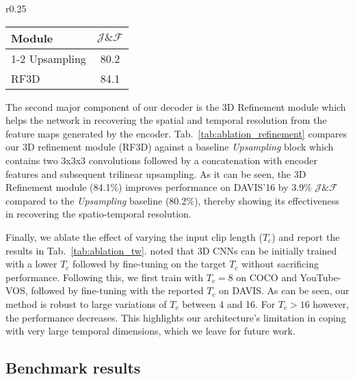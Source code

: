 \documentclass{bmvc2k}
\newcommand{\PAR}[1]{\vskip4pt \noindent {\bf #1~}}
\begin{document}
\begin{wraptable}{r}{0.25\textwidth}
\setlength{\tabcolsep}{5px}\footnotesize
\vspace{-19pt}\begin{tabular}[t]{l | c} \toprule
            Module & $\mathcal{J}\&\mathcal{F}$ \\
\cmidrule(lr){1-2}
                Upsampling &80.2 \\
                RF3D  &  84.1\\
\bottomrule
            \end{tabular}
\caption{Analysis of different decoder modules on DAVIS'16.}
\vspace{-8px}
\label{tab:ablation_refinement}
\end{wraptable} 
The second major component of our decoder is the 3D Refinement module which helps the network in recovering the spatial and temporal resolution from the feature maps generated by the encoder. Tab.~\ref{tab:ablation_refinement} compares our 3D refinement module (RF3D) against a baseline \textit{Upsampling} block which contains two 3x3x3 convolutions followed by a concatenation with encoder features and subsequent trilinear upsampling. As it can be seen, the 3D Refinement module (84.1\%) improves performance on DAVIS'16 by 3.9\% $\mathcal{J\&F}$ compared to the \textit{Upsampling} baseline (80.2\%), thereby showing its effectiveness in recovering the spatio-temporal resolution. 


\PAR{Input Clip Length:} Finally, we ablate the effect of varying the input clip length ($T_c$) and report the results in Tab.~\ref{tab:ablation_tw}. \cite{Tran18CVPR} noted that 3D CNNs can be initially trained with a lower $T_c$ followed by fine-tuning on the target $T_c$ without sacrificing performance. Following this, we first train with $T_c=8$ on COCO and YouTube-VOS, followed by fine-tuning with the reported $T_c$ on DAVIS. 
As can be seen, our method is robust to large variations of $T_c$ between 4 and 16. For $T_c>16$ however, the performance decreases. This highlights our architecture's limitation in coping with very large temporal dimensions, which we leave for future work.

\subsection{Benchmark results}
\end{document}
